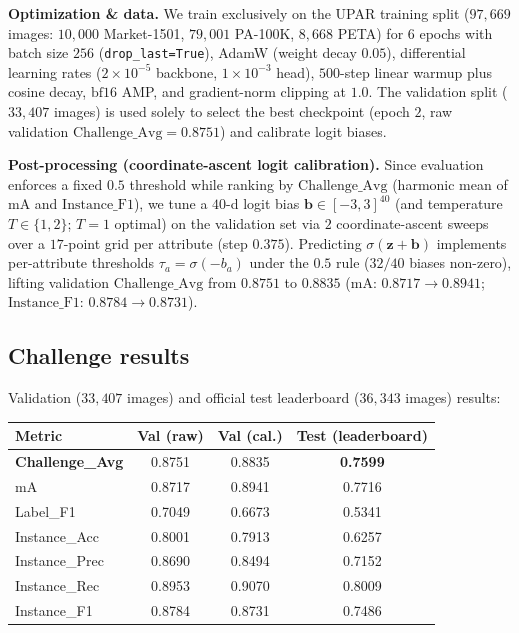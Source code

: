 \documentclass[a4paper, 10pt, conference]{ieeeconf}
\begin{document}
\textbf{Optimization \& data.} We train exclusively on the UPAR training split ($97{,}669$ images: $10{,}000$ Market-1501, $79{,}001$ PA-100K, $8{,}668$ PETA) for $6$ epochs with batch size $256$ (\texttt{drop\_last=True}), AdamW (weight decay $0.05$), differential learning rates ($2\times10^{-5}$ backbone, $1\times10^{-3}$ head), $500$-step linear warmup plus cosine decay, $\text{bf16}$ AMP, and gradient-norm clipping at $1.0$. The validation split ($33{,}407$ images) is used solely to select the best checkpoint (epoch $2$, raw validation $\text{Challenge\_Avg}=0.8751$) and calibrate logit biases.

\textbf{Post-processing (coordinate-ascent logit calibration).} Since evaluation enforces a fixed $0.5$ threshold while ranking by $\text{Challenge\_Avg}$ (harmonic mean of $\text{mA}$ and $\text{Instance\_F1}$), we tune a $40$-d logit bias $\mathbf{b}\in[-3,3]^{40}$ (and temperature $T\in\{1,2\}$; $T=1$ optimal) on the validation set via $2$ coordinate-ascent sweeps over a $17$-point grid per attribute (step $0.375$). Predicting $\sigma(\mathbf{z}+\mathbf{b})$ implements per-attribute thresholds $\tau_a=\sigma(-b_a)$ under the $0.5$ rule ($32/40$ biases non-zero), lifting validation $\text{Challenge\_Avg}$ from $0.8751$ to $0.8835$ ($\text{mA}$: $0.8717\to0.8941$; $\text{Instance\_F1}$: $0.8784\to0.8731$).

\subsection{Challenge results}
Validation ($33{,}407$ images) and official test leaderboard ($36{,}343$ images) results:

\begin{table}[h]
\centering
\begin{tabular}{l c c c}
\hline
Metric & Val (raw) & Val (cal.) & \textbf{Test (leaderboard)} \\
\hline
\textbf{Challenge\_Avg} & 0.8751 & 0.8835 & \textbf{0.7599} \\
mA & 0.8717 & 0.8941 & 0.7716 \\
Label\_F1 & 0.7049 & 0.6673 & 0.5341 \\
Instance\_Acc & 0.8001 & 0.7913 & 0.6257 \\
Instance\_Prec & 0.8690 & 0.8494 & 0.7152 \\
Instance\_Rec & 0.8953 & 0.9070 & 0.8009 \\
Instance\_F1 & 0.8784 & 0.8731 & 0.7486 \\
\hline
\end{tabular}
\end{table}
\end{document}
